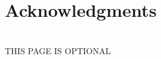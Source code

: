 \documentclass[./dissertation.tex]{subfiles}
\begin{document}
  \chapter*{Acknowledgments}


  \lipsum[7]\\
  THIS PAGE IS OPTIONAL
\end{document}
